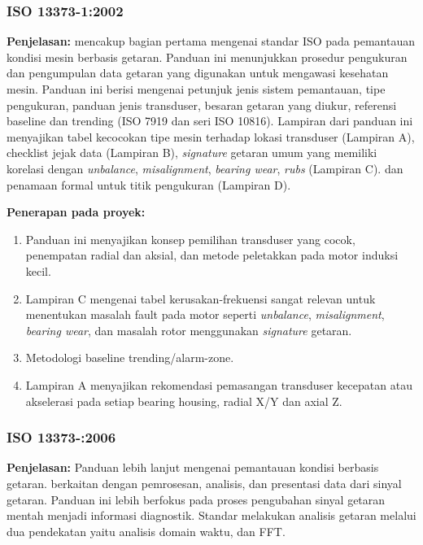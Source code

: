 \documentclass{elsinta}
\begin{document}
\subsubsection{ISO 13373-1:2002}
\textbf{Penjelasan:} 
\cite{2.1.4} mencakup bagian pertama mengenai standar ISO pada pemantauan kondisi mesin berbasis getaran. Panduan ini menunjukkan prosedur pengukuran dan pengumpulan data getaran yang digunakan untuk mengawasi kesehatan mesin. Panduan ini berisi mengenai petunjuk jenis sistem pemantauan, tipe pengukuran, panduan jenis transduser, besaran getaran yang diukur, referensi baseline dan trending (ISO 7919 dan seri ISO 10816). Lampiran dari panduan ini menyajikan tabel kecocokan tipe mesin terhadap lokasi transduser (Lampiran A), checklist jejak data (Lampiran B), \textit{signature} getaran umum yang memiliki korelasi dengan \textit{unbalance}, \textit{misalignment}, \textit{bearing wear}, \textit{rubs }(Lampiran C). dan penamaan formal untuk titik pengukuran (Lampiran D).

\textbf{Penerapan pada proyek:}
\begin{enumerate}
    \item Panduan ini menyajikan konsep pemilihan transduser yang cocok, penempatan radial dan aksial, dan metode peletakkan pada motor induksi kecil.
    \item Lampiran C mengenai tabel kerusakan-frekuensi sangat relevan untuk menentukan masalah fault pada motor seperti \textit{unbalance}, \textit{misalignment}, \textit{bearing wear}, dan masalah rotor menggunakan \textit{signature} getaran.
    \item Metodologi baseline trending/alarm-zone.
    \item Lampiran A menyajikan rekomendasi pemasangan transduser kecepatan atau akselerasi pada setiap bearing housing, radial X/Y dan axial Z.
\end{enumerate}

\subsubsection{ISO 13373-:2006}
\textbf{Penjelasan:} Panduan lebih lanjut mengenai pemantauan kondisi berbasis getaran. \cite{2.1.5} berkaitan dengan pemrosesan, analisis, dan presentasi data dari sinyal getaran. Panduan ini lebih berfokus pada proses pengubahan sinyal getaran mentah menjadi informasi diagnostik. Standar melakukan analisis getaran melalui dua pendekatan yaitu analisis domain waktu, dan FFT.
\end{document}

